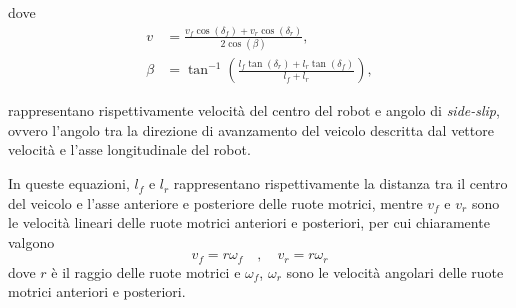 dove
\begin{align}
    v     & =  \frac{v_f \cos(\delta_f) + v_r \cos(\delta_r)}{2\cos(\beta)}, \label{eq:v_betamodel}                       \\
    \beta & =  \tan^{-1}\left(\frac{l_f \tan(\delta_r) + l_r \tan(\delta_f)}{l_f + l_r}\right), \label{eq:beta_betamodel}
\end{align}

rappresentano rispettivamente velocità del centro del robot e angolo di \textit{side-slip}, ovvero l'angolo tra la direzione di avanzamento del veicolo descritta dal vettore velocità e l'asse longitudinale del robot.

In queste equazioni, $l_f$ e $l_r$ rappresentano rispettivamente la distanza tra il centro del veicolo e l'asse anteriore e posteriore delle ruote motrici, mentre $v_f$ e $v_r$ sono le velocità lineari delle ruote motrici anteriori e posteriori, per cui chiaramente valgono
\begin{equation}\label{eq:tan_vel}
    v_f = r \omega_f \quad , \quad v_r = r \omega_r
\end{equation}
dove $r$ è il raggio delle ruote motrici e $\omega_f$, $\omega_r$ sono le velocità angolari delle ruote motrici anteriori e posteriori.

